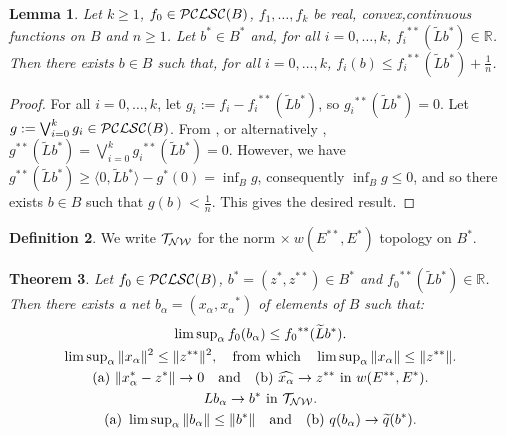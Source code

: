 \documentclass[letterpaper]{article}
\theoremstyle{plain}
\newtheorem{theorem}{Theorem}[section]
\newtheorem{lemma}[theorem]{Lemma}
\theoremstyle{definition}
\newtheorem{definition}[theorem]{Definition}
\numberwithin{equation}{section}
\newcommand{\bra}[2]{\langle#1,#2\rangle}
\newcommand{\dbs}{^{**}}
\newcommand{\limsupn}{\limsup\nolimits}
\newcommand{\Lt}{{\wt L}}
\newcommand{\nth}{{\textstyle\frac{1}{n}}}
\newcommand{\PCLSC}{{\cal PCLSC}}
\newcommand{\qt}{\wt q}
\newcommand{\RR}{\mathbb R}
\newcommand{\TNW}{\cal{T_{NW}}}
\newcommand{\wh}{\widehat}
\newcommand{\wt}{\widetilde}
\newcommand{\Def}{Definition~\ref}
\newcommand{\Lem}{Lemma~\ref}
\newcommand{\Thm}{Theorem~\ref}
\begin{document}
\begin{lemma}\label{NEWFlem}
Let $k \ge 1$, $f_0 \in \PCLSC(B)$, $f_1,\dots,f_k$ be real, convex,\break continuous functions on $B$ and $n \ge 1$.   Let $b^* \in B^*$ and, for all $i = 0, \dots, k$, ${f_i}\dbs(\Lt b^*) \in \RR$.   Then there exists $b \in B$ such that, for all $i = 0, \dots, k$, $f_i(b) \le {f_i}\dbs(\Lt b^*) + \nth$.
\end{lemma}
%
%
\begin{proof}
For all $i = 0, \dots, k$, let $g_i := f_i - {f_i}\dbs(\Lt b^*)$, so ${g_i}\dbs(\Lt b^*) = 0$.   Let $g := \bigvee_{i = 0}^k{g_i} \in \PCLSC(B)$. From \cite[Corollary 45.5, p.\ 174]{HBM}, or alternatively \cite[Corollary~7, p.\ 3558]{FS}, $g\dbs(\Lt b^*) = \bigvee_{i = 0}^k{g_i}\dbs(\Lt b^*) = 0$.   However, we have $g\dbs(\Lt b^*) \ge \bra{0}{\Lt b^*} -  g^*(0) = \inf_Bg$, consequently $\inf_Bg \le 0$, and so there exists $b \in B$ such that $g(b) < \nth$.   This gives the desired result.  
\end{proof}
\begin{definition}\label{NWdef}
We write $\TNW$ for the  norm $\times\ w(E\dbs,E^*)$ topology on $B^*$.
\end{definition} 
\begin{theorem}\label{NETthm}
Let $f_0 \in \PCLSC(B)$, $b^* = (z^*,z\dbs) \in B^*$ and ${f_0}\dbs(\Lt b^*) \in \RR$.  Then there exists a net $b_\alpha = (x_\alpha,{x_\alpha}^*)$ of elements of $B$ such that:
%
\begin{gather}
\limsupn_\alpha f_0(b_\alpha) \le {f_0}\dbs(\Lt b^*).\label{NET1}\\
\limsupn_\alpha \|x_\alpha\|^2 \le \|z\dbs\|^2,\hbox{\quad from which\quad}\limsupn_\alpha \|x_\alpha\| \le \|z\dbs\|.\label{NET2}\\
\hbox{\rm(a) }\|x_\alpha^* - z^*\| \to 0\hbox{\quad and\quad \rm(b) }{\wh{x_\alpha}} \to {z\dbs}\hbox{ in } w(E\dbs,E^*).\label{NET3}\\
Lb_\alpha \to b^*\hbox{ in }{\TNW}.\label{NET4}\\
\hbox{\rm(a) }\limsupn_\alpha \|b_\alpha\| \le \|b^*\|\hbox{\quad and\quad \rm(b) }q(b_\alpha) \to \qt(b^*).\label{NET5}
\end{gather}
\end{theorem}
\end{document}
